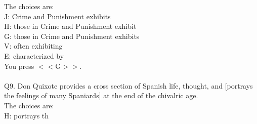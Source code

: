 \documentclass[pdflatex,sn-nature]{sn-jnl}%
\theoremstyle{thmstyleone}%
\theoremstyle{thmstyletwo}%
\theoremstyle{thmstylethree}%
\begin{document}
The choices are: $~$\\ 
J: Crime and Punishment exhibits $~$\\ 
H: those in Crime and Punishment exhibit $~$\\ 
G: those in Crime and Punishment exhibits $~$\\ 
V: often exhibiting $~$\\ 
E: characterized by $~$\\ 
You press $<<$G$>>$. $~$\\ 
 $~$\\ 
Q9. Don Quixote provides a cross section of Spanish life, thought, and [portrays the feelings of many Spaniards] at the end of the chivalric age. $~$\\ 
The choices are: $~$\\ 
H: portrays th
\end{document}
